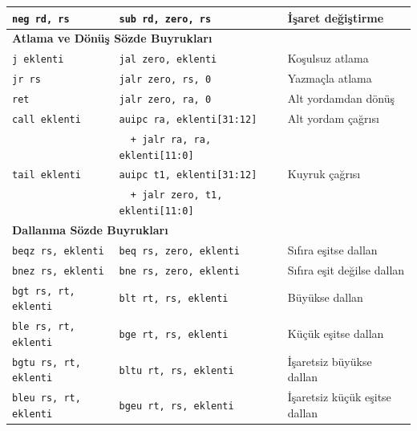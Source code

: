 {\begin{longtable}{@{}l@{\quad}l@{\quad}l@{}}
\texttt{neg rd, rs} &
\texttt{sub rd, zero, rs} &
İşaret değiştirme\index{neg} \\[3pt]

\midrule
\multicolumn{3}{l}{\textbf{Atlama ve Dönüş Sözde Buyrukları}} \\
\midrule
\texttt{j eklenti} &
\texttt{jal zero, eklenti} &
Koşulsuz atlama\index{j} \\[3pt]

\texttt{jr rs} &
\texttt{jalr zero, rs, 0} &
Yazmaçla atlama\index{jr} \\[3pt]

\texttt{ret} &
\texttt{jalr zero, ra, 0} &
Alt yordamdan dönüş\index{ret} \\[3pt]

\texttt{call eklenti} &
\texttt{auipc ra, eklenti[31:12]} &
Alt yordam çağrısı\index{call} \\
 &
\texttt{~~+ jalr ra, ra, eklenti[11:0]} &
 \\[3pt]

\texttt{tail eklenti} &
\texttt{auipc t1, eklenti[31:12]} &
Kuyruk çağrısı\index{tail} \\
 &
\texttt{~~+ jalr zero, t1, eklenti[11:0]} &
 \\[3pt]

\midrule
\multicolumn{3}{l}{\textbf{Dallanma Sözde Buyrukları}} \\
\midrule
\texttt{beqz rs, eklenti} &
\texttt{beq rs, zero, eklenti} &
Sıfıra eşitse dallan\index{beqz} \\[3pt]

\texttt{bnez rs, eklenti} &
\texttt{bne rs, zero, eklenti} &
Sıfıra eşit değilse dallan\index{bnez} \\[3pt]

\texttt{bgt rs, rt, eklenti} &
\texttt{blt rt, rs, eklenti} &
Büyükse dallan\index{bgt} \\[3pt]

\texttt{ble rs, rt, eklenti} &
\texttt{bge rt, rs, eklenti} &
Küçük eşitse dallan\index{ble} \\[3pt]

\texttt{bgtu rs, rt, eklenti} &
\texttt{bltu rt, rs, eklenti} &
İşaretsiz büyükse dallan\index{bgtu} \\[3pt]

\texttt{bleu rs, rt, eklenti} &
\texttt{bgeu rt, rs, eklenti} &
İşaretsiz küçük eşitse dallan\index{bleu} \\[3pt]

\end{longtable}
}%

